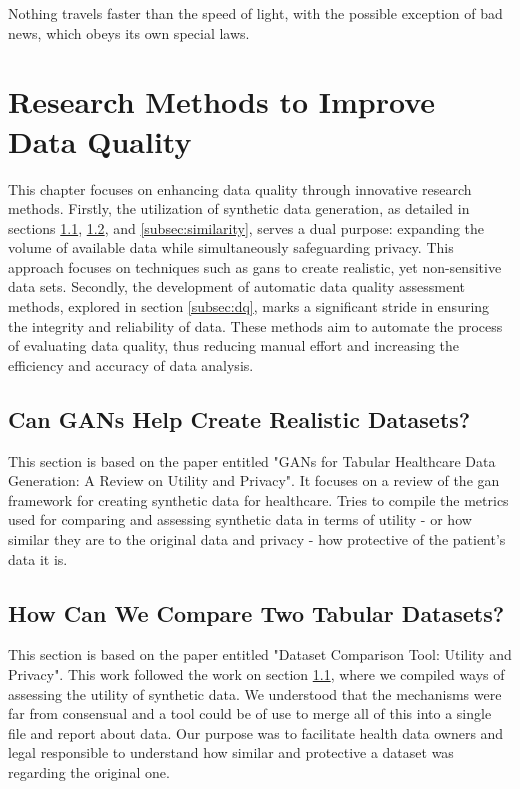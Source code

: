 
\begin{savequote}[85mm]
    Nothing travels faster than the speed of light, 
    with the possible exception of bad news, which obeys its own special laws.
    \end{savequote}


\chapter{Research Methods to Improve Data Quality}\label{chap:goal1}
This chapter focuses on enhancing data quality through innovative research methods. Firstly, the utilization of synthetic data generation, as detailed in sections \ref{subsec:gans}, \ref{subsec:tabular}, and \ref{subsec:similarity}, serves a dual purpose: expanding the volume of available data while simultaneously safeguarding privacy. This approach focuses on  techniques such as \acp{gan} to create realistic, yet non-sensitive data sets. Secondly, the development of automatic data quality assessment methods, explored in section \ref{subsec:dq}, marks a significant stride in ensuring the integrity and reliability of data. These methods aim to automate the process of evaluating data quality, thus reducing manual effort and increasing the efficiency and accuracy of data analysis.



\section{Can GANs Help Create Realistic Datasets?}\label{subsec:gans}
This section is based on the paper entitled "GANs for Tabular Healthcare Data Generation: A Review on Utility and Privacy". It focuses on a review of the \ac{gan} framework for creating synthetic data for healthcare. Tries to compile the metrics used for comparing and assessing synthetic data in terms of utility - or how similar they are to the original data and privacy - how protective of the patient's data it is. 



\section{How Can We Compare Two Tabular Datasets?}\label{subsec:tabular}
This section is based on the paper entitled "Dataset Comparison Tool: Utility and Privacy". This work followed the work on section \ref{subsec:gans}, where we compiled ways of assessing the utility of synthetic data. We understood that the mechanisms were far from consensual and a tool could be of use to merge all of this into a single file and report about data. Our purpose was to facilitate health data owners and legal responsible to understand how similar and protective a dataset was regarding the original one.

